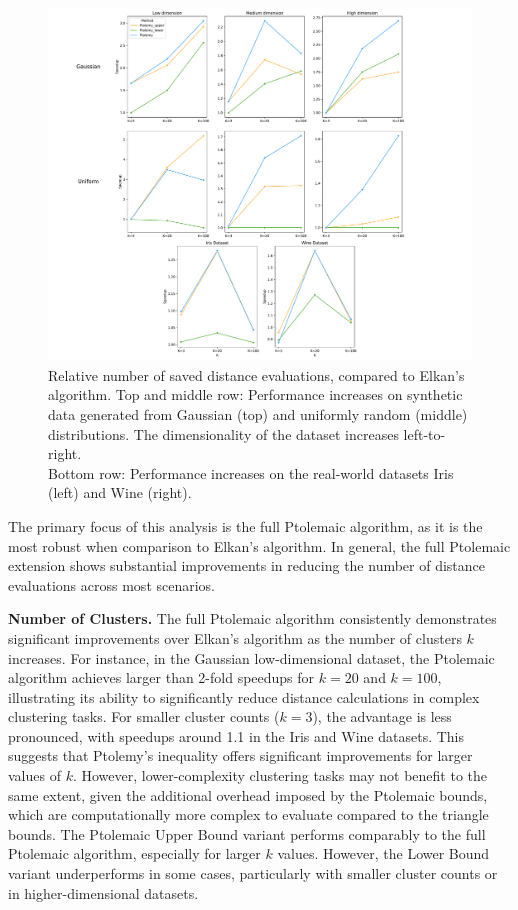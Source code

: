 \begin{figure}[h]
	\centering
	\includegraphics[width=\textwidth]{fig/combined_plot.pdf}
	\caption{
		Relative number of saved distance evaluations, compared to Elkan's algorithm.
		Top and middle row: Performance increases on synthetic data generated from Gaussian (top) and uniformly random (middle) distributions.
		The dimensionality of the dataset increases left-to-right.\\
		Bottom row: Performance increases on the real-world datasets Iris (left) and Wine (right).
	}
	\label{fig:combined}
\end{figure}


The primary focus of this analysis is the full Ptolemaic algorithm, as it is the most robust when comparison to Elkan's algorithm.
In general, the full Ptolemaic extension shows substantial improvements in reducing the number of distance evaluations across most scenarios.

\textbf{Number of Clusters.}
The full Ptolemaic algorithm consistently demonstrates significant improvements over Elkan’s algorithm as the number of clusters $k$ increases.
For instance, in the Gaussian low-dimensional dataset, the Ptolemaic algorithm achieves larger than 2-fold speedups for $k = 20$ and $k = 100$, illustrating its ability to significantly reduce distance calculations in complex clustering tasks.
For smaller cluster counts ($k = 3$), the advantage is less pronounced, with speedups around 1.1 in the Iris and Wine datasets.
This suggests that Ptolemy's inequality offers significant improvements for larger values of $k$.
However, lower-complexity clustering tasks may not benefit to the same extent,
given the additional overhead imposed by the Ptolemaic bounds, which are computationally more complex to evaluate compared to the triangle bounds.
The Ptolemaic Upper Bound variant performs comparably to the full Ptolemaic algorithm, especially for larger $k$ values.
However, the Lower Bound variant underperforms in some cases, particularly with smaller cluster counts or in higher-dimensional datasets.

